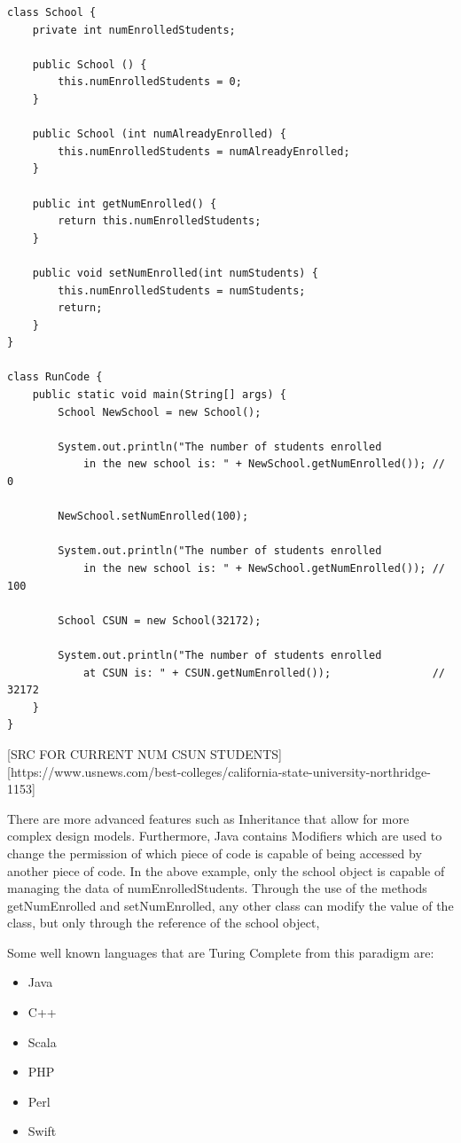 \begin{verbatim}
class School {
    private int numEnrolledStudents;
    
    public School () {
        this.numEnrolledStudents = 0;
    }
    
    public School (int numAlreadyEnrolled) {
        this.numEnrolledStudents = numAlreadyEnrolled;
    }
    
    public int getNumEnrolled() {
        return this.numEnrolledStudents;
    }
    
    public void setNumEnrolled(int numStudents) {
        this.numEnrolledStudents = numStudents;
        return;
    }
}

class RunCode {
    public static void main(String[] args) {
        School NewSchool = new School();
        
        System.out.println("The number of students enrolled 
            in the new school is: " + NewSchool.getNumEnrolled()); // 0
        
        NewSchool.setNumEnrolled(100);
        
        System.out.println("The number of students enrolled
            in the new school is: " + NewSchool.getNumEnrolled()); // 100
        
        School CSUN = new School(32172);
        
        System.out.println("The number of students enrolled
            at CSUN is: " + CSUN.getNumEnrolled());                // 32172
    }
}
\end{verbatim}

[SRC FOR CURRENT NUM CSUN STUDENTS][https://www.usnews.com/best-colleges/california-state-university-northridge-1153]

There are more advanced features such as Inheritance that allow for more complex design models.
Furthermore, Java contains Modifiers which are used to change the permission of which piece of code is capable of being accessed by another piece of code.
In the above example, only the school object is capable of managing the data of numEnrolledStudents.
Through the use of the methods getNumEnrolled and setNumEnrolled, any other class can modify the value of the class, but only through the reference of the school object,

Some well known languages that are Turing Complete from this paradigm are: 
\begin{itemize}
    \item Java
    \item C++
    \item Scala
    \item PHP
    \item Perl
    \item Swift        
\end{itemize}

